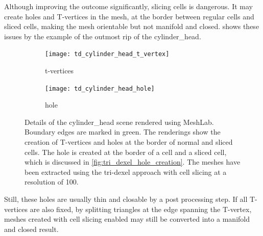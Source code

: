 Although improving the outcome significantly, slicing cells is dangerous.
It may create holes and T-vertices in the mesh, at the border between regular cells and sliced cells, making the mesh orientable but not manifold and closed.
 shows these issues by the example of the outmost rip of the cylinder\_head.
%
\begin{figure}
	\centering
	\begin{subfigure}[b]{0.49\textwidth}
		\centering
		\texttt{[image: td\_cylinder\_head\_t\_vertex]}
		\caption{t-vertices}
		\label{fig:td_cylinder_head_t_vertex}
	\end{subfigure}
	\begin{subfigure}[b]{0.49\textwidth}
		\centering
		\texttt{[image: td\_cylinder\_head\_hole]}
		\caption{hole}
		\label{fig:td_cylinder_head_hole}
	\end{subfigure}
	\caption{
		Details of the cylinder\_head scene rendered using MeshLab.
		Boundary edges are marked in green.
		The renderings show the creation of T-vertices and holes at the border of normal and sliced cells.
		The hole is created at the border of a cell and a sliced cell, which is discussed in \cref{fig:tri_dexel_hole_creation}.
		The meshes have been extracted using the tri-dexel approach with cell slicing at a resolution of 100.
	}
	\label{fig:td_cylinder_head_issues}
\end{figure}
%
Still, these holes are usually thin and closable by a post processing step.
If all T-vertices are also fixed, \eg by splitting triangles at the edge spanning the T-vertex, meshes created with cell slicing enabled may still be converted into a manifold and closed result.

